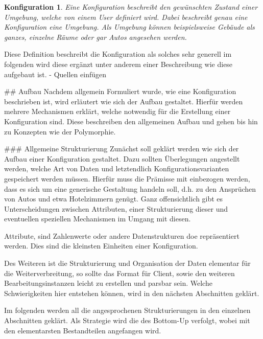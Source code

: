 \newtheorem{mydef}{Konfiguration}
\begin{mydef}
Eine Konfiguration beschreibt den gewünschten Zustand einer Umgebung, welche von einem User definiert wird. Dabei beschreibt genau eine Konfiguration eine Umgebung. Als
Umgebung können beispielsweise Gebäude als ganzes, einzelne Räume oder gar Autos angesehen werden.
\end{mydef}

Diese Definition beschreibt die Konfiguration als solches sehr generell im folgenden wird diese ergänzt unter anderem einer Beschreibung wie diese aufgebaut ist. 
- Quellen einfügen 

## Aufbau
Nachdem allgemein Formuliert wurde, wie eine Konfiguration beschrieben ist, wird erläutert wie sich der Aufbau gestaltet. Hierfür werden mehrere Mechanismen erklärt, welche notwendig für die Erstellung einer Konfiguration sind. Diese beschreiben den allgemeinen Aufbau und gehen bis hin zu Konzepten wie der Polymorphie. 

### Allgemeine Strukturierung
Zunächst soll geklärt werden wie sich der Aufbau einer Konfiguration gestaltet. Dazu sollten Überlegungen angestellt werden, welche Art von Daten und letztendlich Konfigurationsvarianten gespeichert werden müssen. Hierfür muss die Prämisse mit einbezogen werden, dass es sich um eine generische Gestaltung handeln soll, d.h. zu den Ansprüchen von Autos und etwa Hotelzimmern genügt. 
Ganz offensichtlich gibt es Unterscheidungen zwischen Attributen, einer Strukturierung dieser und eventuellen speziellen Mechanismen im Umgang mit diesen.

Attribute, sind Zahlenwerte oder andere Datenstrukturen doe repräsentiert werden. Dies sind die kleinsten Einheiten einer Konfiguration.

Des Weiteren ist die Strukturierung und Organisation der Daten elementar für die Weiterverbreitung, so sollte das Format für Client, sowie den weiteren Bearbeitungsinstanzen leicht zu erstellen und parsbar sein. Welche Schwierigkeiten hier entstehen können, wird in den nächsten Abschnitten geklärt. 

Im folgenden werden all die angesprochenen Strukturierungen in den einzelnen Abschnitten geklärt. Als Strategie wird die des Bottom-Up verfolgt, wobei mit den elementarsten Bestandteilen angefangen wird. 


